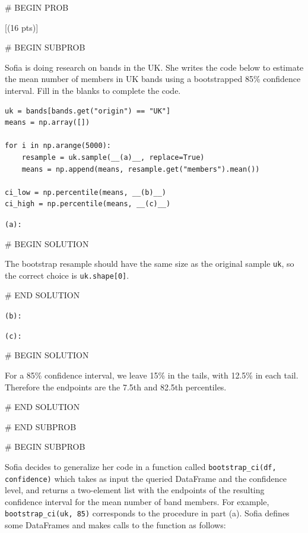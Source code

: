 \documentclass[twoside,12pt]{article}
\begin{document}
{\newpage

# BEGIN PROB

[(16 pts)]


# BEGIN SUBPROB


Sofia is doing research on bands in the UK. She writes the code below to estimate the mean number of members in UK bands using a bootstrapped 85\% confidence interval. Fill in the blanks to complete the code.

\bigskip

\begin{verbatim}
uk = bands[bands.get("origin") == "UK"]
means = np.array([])

for i in np.arange(5000):
    resample = uk.sample(__(a)__, replace=True)
    means = np.append(means, resample.get("members").mean())

ci_low = np.percentile(means, __(b)__)
ci_high = np.percentile(means, __(c)__)
\end{verbatim}

\bigskip
\texttt{(a):} 

# BEGIN SOLUTION


The bootstrap resample should have the same size as the original sample \texttt{uk}, so the correct choice is \texttt{uk.shape[0]}.


# END SOLUTION

\texttt{(b):} 

\smallskip
\texttt{(c):} 

# BEGIN SOLUTION


For a 85\% confidence interval, we leave 15\% in the tails, with 12.5\% in each tail. Therefore the endpoints are the 7.5th and 82.5th percentiles.


# END SOLUTION



# END SUBPROB

\bigskip

# BEGIN SUBPROB


Sofia decides to generalize her code in a function called \texttt{bootstrap\_ci(df, confidence)} which takes as input the queried DataFrame and the confidence level, and returns a two-element list with the endpoints of the resulting confidence interval for the mean number of band members. For example, \texttt{bootstrap\_ci(uk, 85)} corresponds to the procedure in part (a). Sofia defines some DataFrames and makes calls to the function as follows:

}
\end{document}
